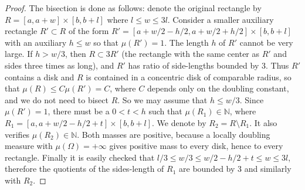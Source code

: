 \documentclass[12pt,twoside,final,psamsfonts]{amsart}
\theoremstyle{plain}
\theoremstyle{remark}
\theoremstyle{definition}
\newcommand{\N}{{\mathbb N}}
\begin{document}
\begin{proof}
The bisection is done as follows: denote the original rectangle by
$R=[a,a+w]\times [b,b+l]$ where $l\le w\le 3l$. Consider a smaller auxiliary
 rectangle
$R'\subset R$ of the form $R'=[a+w/2-h/2,a+w/2+h/2]\times[b,b+l]$ with an 
auxiliary $h\le w$ so
that $\mu(R')=1$. The length $h$ of $R'$ cannot be very large. 
If $h>w/3$, then
$R\subset 3R'$ (the rectangle with the same center as $R'$ and sides three
times as long), and $R'$ has ratio of side-lengths bounded by $3$. Thus $R'$
contains a disk and $R$ is contained in a concentric disk of comparable
radius, so that $\mu(R)\le C\mu(R')= C$, where $C$ depends only on the
doubling constant, and we do not need to bisect $R$. So we may assume that
$h\le w/3$. Since $\mu(R')=1$, there must be a $0<t<h$ such that
$\mu(R_1)\in\N$, where $R_1=[a,a+w/2-h/2+t]\times[b,b+l]$. We
denote by $R_2=R\setminus R_1$. It also verifies $\mu(R_2)\in \N$. Both
masses are positive, because a locally doubling measure with
$\mu(\Omega)=+\infty$ gives positive mass to every disk, hence to every
rectangle. Finally it is
easily checked that $l/3\le w/3\le w/2-h/2+t\le w\le 3l$, therefore the
quotients of the sides-length of $R_1$ are bounded by 3 and similarly with
$R_2$.

%


\end{proof}
\end{document}
